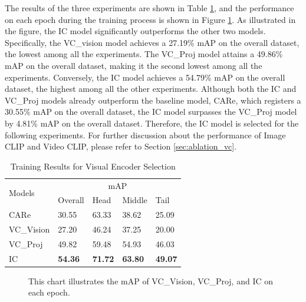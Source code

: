 
The results of the three experiments are shown in Table \ref{tab:resultsbackbone}, and the performance on each epoch during the training process is shown in Figure \ref{fig:tp_backbone}. As illustrated in the figure, the IC model significantly outperforms the other two models. Specifically, the VC\_vision model achieves a 27.19\% mAP on the overall dataset, the lowest among all the experiments. The VC\_Proj model attains a 49.86\% mAP on the overall dataset, making it the second lowest among all the experiments. Conversely, the IC model achieves a 54.79\% mAP on the overall dataset, the highest among all the other experiments. Although both the IC and VC\_Proj models already outperform the baseline model, CARe, which registers a 30.55\% mAP on the overall dataset, the IC model surpasses the VC\_Proj model by 4.81\% mAP on the overall dataset. Therefore, the IC model is selected for the following experiments. For further discussion about the performance of Image CLIP and Video CLIP, please refer to Section \ref{sec:ablation_vc}.

\begin{table}[ht]
    \centering
    \caption{Training Results for Visual Encoder Selection}
    \label{tab:resultsbackbone}
    \begin{tabular}{lllll}
        \toprule
        \multirow{2}{*}{Models} & \multicolumn{4}{c}{mAP} \\
        \cmidrule{2-5} 
        {} & Overall & Head  & Middle & Tail \\
        \midrule
        CARe        & 30.55   & 63.33 & 38.62 & 25.09 \\
        VC\_Vision  & 27.20   & 46.24 & 37.25 & 20.00 \\
        VC\_Proj    & 49.82   & 59.48 & 54.93 & 46.03 \\
        IC          & \textbf{54.36} & \textbf{71.72} & \textbf{63.80} & \textbf{49.07} \\
        \bottomrule
    \end{tabular}
\end{table}


\begin{figure}[ht]
    \centering
    \resizebox{1.0\textwidth}{!}{}
    \caption[mAP of VC\_Vision, VC\_Proj, and IC on each Epoch]{This chart illustrates the mAP of VC\_Vision, VC\_Proj, and IC on each epoch.}
    \label{fig:tp_backbone}
\end{figure}


